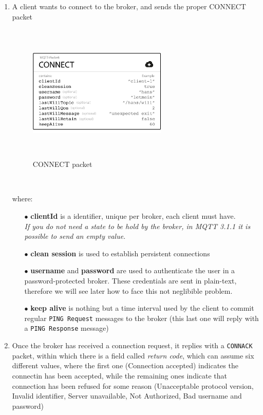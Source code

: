 \documentclass[12pt]{report}
\begin{document}
\begin{enumerate}
\setlength{\itemindent}{+5mm}
\item A client wants to connect to the broker, and sends the proper CONNECT packet

\begin{figure}[H]
\includegraphics[width=6.6cm,height=6.6cm,keepaspectratio]{connect_message}
\centering
\caption{CONNECT packet}
\end{figure}\

where:

\begin{itemize}
\setlength{\itemindent}{+4mm}
  \item[$\bullet$] \textbf{clientId} is a identifier, unique per broker, each client must have.\\
  \textit{If you do not need a state to be hold by the broker, in MQTT 3.1.1 it is possible to send an empty value.}
  \item[$\bullet$] \textbf{clean session} is used to establish persistent connections
  \item[$\bullet$] \textbf{username} and \textbf{password} are used to authenticate the user in a password-protected broker. These credentials are sent in plain-text, therefore we will see later how to face this not neglibible problem.
  \item[$\bullet$] \textbf{keep alive} is nothing but a time interval used by the client to commit regular \texttt{PING Request} messages to the broker (this last one will reply with a \texttt{PING Response} message)
\end{itemize}

\item Once the broker has received a connection request, it replies with a \texttt{CONNACK} packet, within which there is a field called \textit{return code}, which can assume six different values, where the first one (Connection accepted) indicates the connectin has been accepted, while the remaining ones indicate that connection has been refused for some reason (Unacceptable protocol version, Invalid identifier, Server unavailable, Not Authorized, Bad username and password)


\end{enumerate}
\end{document}

